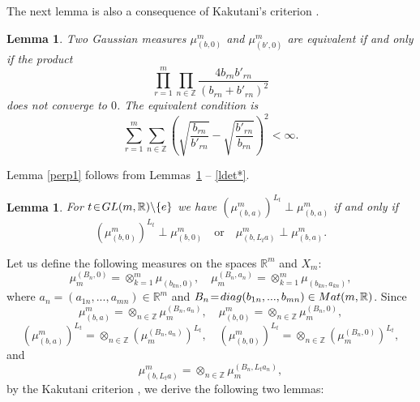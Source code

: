 \documentclass[preprint,12pt]{elsarticle}
\newtheorem{lem}[thm]{Lemma}
\numberwithin{equation}{section}
\begin{document}
The next lemma is also a consequence of Kakutani's criterion {\rm \cite {Kak48}}.
\begin{lem}
 \label{l.eq-prod.m=3}
 Two Gaussian  measures $\mu_{(b,0)}^m$ and $\mu_{(b',0)}^m$ are equivalent if and only if the product
\begin{equation}
\label{eq-mu-prod.m=3} 
\prod_{r=1}^m\prod_{n\in \mathbb Z}\frac{4b_{rn}b'_{rn}}{(b_{rn}+b'_{rn})^2}
\end{equation}
does not converge to $0$. The equivalent condition is 
\begin{equation}
 \label{eq-mu-sum.m=3} 
\sum_{r=1}^m\sum_{n\in \mathbb Z}
\left(\sqrt{\frac{b_{rn}}{b'_{rn}}}- \sqrt{\frac{b'_{rn}}{b_{rn}}}\right)^2<\infty.
\end{equation}
\end{lem}



Lemma \ref{perp1} follows from Lemmas~\ref{perp3} -- \ref{ldet*}.
%
\begin{lem}
\label{perp3} For $t\!\in\!{\rm GL}(m,{\mathbb R})\backslash\{e\}$ we have
$(\mu_{(b,a)}^m)^{L_t}\!\perp\!\mu_{(b,a)}^m$ if and only if
 \begin{equation}
  \label{7.1}
(\mu_{(b,0)}^m)^{L_t}\perp\mu_{(b,0)}^m\quad\text{or}\quad
\mu_{(b,{L_t}a)}^m\perp\mu_{(b,a)}^m.
 \end{equation}
\end{lem}
Let us define the following measures on the spaces ${\mathbb R}^m$
and $X_m$:
$$
\mu_m^{(B_n,0)}=\otimes_{k=1}^m\mu_{(b_{kn},0)},\quad
\mu_m^{(B_n,a_n)}=\otimes_{k=1}^m\mu_{(b_{kn},a_{kn})},
$$
where $a_n\!=\!(a_{1n},...,a_{mn})\in{\mathbb R}^m$ and
$B_n\!=\!{\rm diag}(b_{1n},...,b_{mn})\in {\rm Mat}(m,{\mathbb R})$. Since
$$
\mu_{(b,a)}^m=\otimes_{n\in{\mathbb Z}}\mu_m^{(B_n,a_n)},\quad
\mu_{(b,0)}^m=\otimes_{n\in{\mathbb Z}}\mu_m^{(B_n,0)},
$$
$$
\left(\mu_{(b,a)}^m\right)^{L_t}=\otimes_{n\in{\mathbb
Z}}\left(\mu_m^{(B_n,a_n)}\right)^{L_t},\quad
\left(\mu_{(b,0)}^m\right)^{L_t}=\otimes_{n\in{\mathbb
Z}}\left(\mu_m^{(B_n,0)}\right)^{L_t},
$$
and
$$
\mu_{(b,{L_t}a)}^m=\otimes_{n\in{\mathbb
Z}}\mu_m^{(B_n,{L_t}a_n)},
$$
by the Kakutani criterion \cite{Kak48}, we derive the following  two lemmas:
\end{document}
